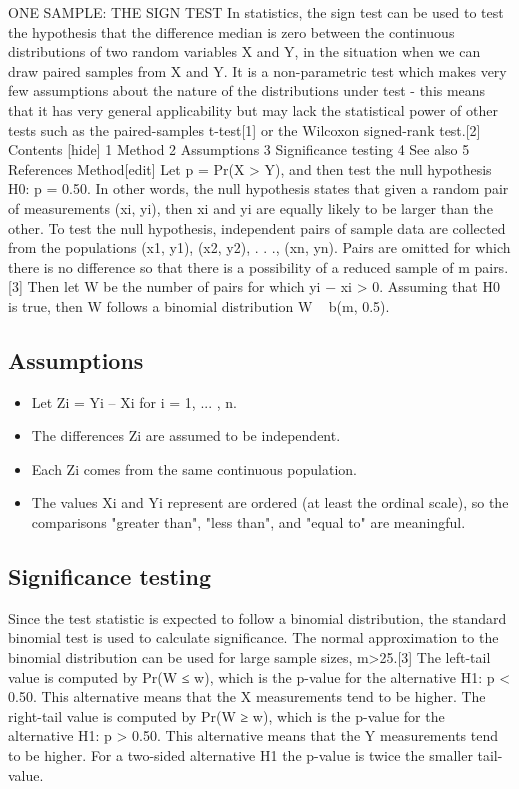 ONE SAMPLE: THE SIGN TEST
In statistics, the sign test can be used to test the hypothesis that the difference median is zero between the continuous distributions of two random variables X and Y, in the situation when we can draw paired samples from X and Y. It is a non-parametric test which makes very few assumptions about the nature of the distributions under test - this means that it has very general applicability but may lack the statistical power of other tests such as the paired-samples t-test[1] or the Wilcoxon signed-rank test.[2]
Contents  [hide] 
1 Method
2 Assumptions
3 Significance testing
4 See also
5 References
Method[edit]
Let p = Pr(X > Y), and then test the null hypothesis H0: p = 0.50. In other words, the null hypothesis states that given a random pair of measurements (xi, yi), then xi and yi are equally likely to be larger than the other.
To test the null hypothesis, independent pairs of sample data are collected from the populations {(x1, y1), (x2, y2), . . ., (xn, yn)}. Pairs are omitted for which there is no difference so that there is a possibility of a reduced sample of m pairs.[3]
Then let W be the number of pairs for which yi − xi > 0. Assuming that H0 is true, then W follows a binomial distribution W ~ b(m, 0.5).
\subsection*{Assumptions}
\begin{itemize}
\item Let Zi = Yi – Xi for i = 1, ... , n.
\item The differences Zi are assumed to be independent.
\item Each Zi comes from the same continuous population.
\item The values Xi and Yi represent are ordered (at least the ordinal scale), so the comparisons "greater than", "less than", and "equal to" are meaningful.
\end{itemize}
\subsection*{Significance testing}
Since the test statistic is expected to follow a binomial distribution, the standard binomial test is used to calculate significance. The normal approximation to the binomial distribution can be used for large sample sizes, m>25.[3]
The left-tail value is computed by Pr(W ≤ w), which is the p-value for the alternative H1: p < 0.50. This alternative means that the X measurements tend to be higher.
The right-tail value is computed by Pr(W ≥ w), which is the p-value for the alternative H1: p > 0.50. This alternative means that the Y measurements tend to be higher.
For a two-sided alternative H1 the p-value is twice the smaller tail-value.

